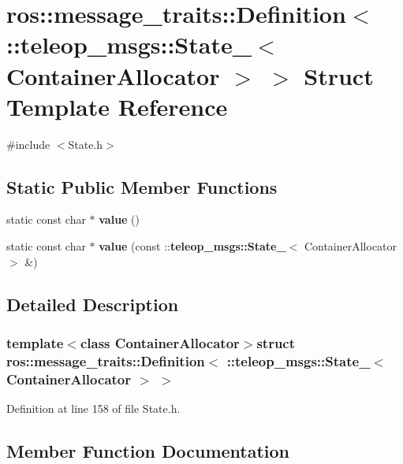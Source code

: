 \section{ros::message\_\-traits::Definition$<$ ::teleop\_\-msgs::State\_\-$<$ ContainerAllocator $>$ $>$ Struct Template Reference}
\label{structros_1_1message__traits_1_1Definition_3_01_1_1teleop__msgs_1_1State___3_01ContainerAllocator_01_4_01_4}


{\ttfamily \#include $<$State.h$>$}

\subsection*{Static Public Member Functions}
\begin{DoxyCompactItemize}
\item 
static const char $\ast$ {\bf value} ()
\item 
static const char $\ast$ {\bf value} (const ::{\bf teleop\_\-msgs::State\_\-}$<$ ContainerAllocator $>$ \&)
\end{DoxyCompactItemize}


\subsection{Detailed Description}
\subsubsection*{template$<$class ContainerAllocator$>$struct ros::message\_\-traits::Definition$<$ ::teleop\_\-msgs::State\_\-$<$ ContainerAllocator $>$ $>$}



Definition at line 158 of file State.h.



\subsection{Member Function Documentation}
